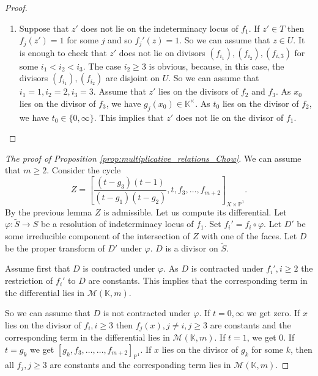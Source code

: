 \documentclass[12pt]{extarticle}
\def\mb{\mathbb}
\def\mc{\mathcal}
\def\k{\mb K}
\def\ph{\varphi}
\def\t{\times}
\def\wt{\widetilde}
\renewcommand{\P}{{\mb P}}
\def \M{\mc M}
\begin{document}
\begin{proof}
\begin{enumerate}
\begin{description}
    \begin{enumerate}
        \item For any $j$ we have $g_j(x_0)=1$. As $f_1$ is undefined in $z'$, we have $t_0=1$. So $z'\not\in U'$.
\item For any $j$ we have $g_j(x_0)\in\k^\t$ and for any $l\geq 4$ we have $f_l(x_0)\in\k^\t$. As $z'$ lies on the indeterminacy locus of $f_1$ we have $t_0\in\k^\t$. So the restrictions of the functions $f_2', f_j', j\geq 4$ to $D$ are non-zero constants.       
    \end{enumerate}

\end{description}



    \item Suppose that $z'$ does not lie on the indeterminacy locus of $f_1$. If $z'\in T$ then $f_j(z')=1$ for some $j$ and so $f_j'(z)=1$. So we can assume that $z\in U$. It is enough to check that $z'$ does not lie on divisors $(f_{i_1}), (f_{i_2}), (f_{i,3})$ for some $i_1<i_2<i_3$. The case $i_2\geq 3$ is obvious, because, in this case, the divisors $(f_{i_1}), (f_{i_2})$ are disjoint on $U$. So we can assume that $i_1=1, i_2=2, i_3=3$. Assume that $z'$ lies on the divisors of $f_2$ and $f_3$. As $x_0$ lies on the divisor of $f_3$, we have $g_j(x_0)\in \k^\t$. As $t_0$ lies on the divisor of $f_2$, we have $t_0\in\{0,\infty\}$. This implies that $z'$ does not lie on the divisor of $f_1$.
\end{enumerate}


\end{proof}




\begin{proof}[The proof of Proposition \ref{prop:multiplicative_relations_Chow}]
We can assume that $m \geq 2$.  Consider the cycle
 $$Z=\left[\dfrac{(t-g_3)(t-1)}{(t-g_1)(t-g_2)},t, f_3,\dots, f_{m+2}\right]_{X\t\P^1}.$$
By the previous lemma $Z$ is admissible. Let us compute its differential. Let $\varphi\colon \wt S\to S$ be a resolution of indeterminacy locus of $f_1$. Set $f_i'=f_i\circ\varphi$. Let $D'$ be some irreducible component of the intersection of $Z$ with one of the faces. Let $D$ be the proper transform of $D'$ under $\varphi$. $D$ is a divisor on $\wt S$.

Assume first that $D$ is contracted under $\ph$. As $D$ is contracted under $f_i',i\geq 2$ the restriction of $f_i'$ to $D$ are constants. This implies that the corresponding term in the differential lies in $\mc M(\k,m)$.


So we can assume that $D$ is not contracted under $\varphi$. If $t=0,\infty$ we get zero. If $x$ lies on the divisor of $f_i, i\geq 3$ then $f_j(x), j\ne i, j\geq 3$ are constants and the corresponding term in the differential lies in $\M(\k,m)$. If $t=1$, we get $0$. If $t=g_k$ we get $[g_k, f_3,\dots, \dots, f_{m+2}]_{\P^1}$. If $x$ lies on the divisor of $g_k$ for some $k$, then all $f_j, j\geq 3$ are constants and the corresponding term lies in $\M(\k,m)$.
\end{proof}
\end{document}
